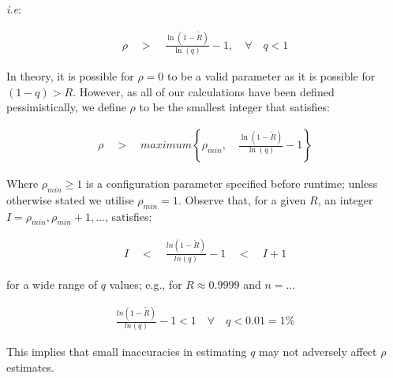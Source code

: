 \begin{description}
        \emph{i.e}:        
        
        \begin{equation} \label{eq:rho_ie}
            \begin{aligned}
                \rho \quad > \quad \frac{\ln\left(1 - \tilde{R}\right)}{\ln(q)} - 1, \quad \forall \quad q < 1
            \end{aligned}
        \end{equation}
               
        In theory, it is possible for $\rho = 0$ to be a valid parameter as it is possible for $(1-q) > R$.  However, as all of our calculations have been defined pessimistically, we define $\rho$ to be the smallest integer that satisfies:
        
        \begin{equation}
            \begin{aligned}
                \rho \quad > \quad maximum \left\{\rho_{min}, \quad \frac{\ln\left(1 - \tilde{R}\right)}{\ln(q)} - 1 \right\}
            \end{aligned}
        \end{equation}
        
        Where $\rho_{min} \geq 1$ is a configuration parameter specified before runtime; unless otherwise stated we utilise $\rho_{min} = 1$.  Observe that, for a given $R$, an integer $I =\rho_{min}, \rho_{min} + 1, \ldots$, satisfies: 

        \begin{equation}
            \begin{aligned}
                I \quad < \quad  \frac{ln \left(1 - \tilde{R}\right)}{ln(q)} - 1 \quad < \quad I + 1
            \end{aligned}
        \end{equation}
        
        for a wide range of $q$ values; e.g., for $R \approx 0.9999$ and $n = \ldots$

        \begin{equation}
            \begin{aligned}
                \frac{ln(1- \tilde{R})}{ln(q)}-1 < 1 \quad \forall \quad q < 0.01 = 1\%
            \end{aligned}
        \end{equation}

        This implies that small inaccuracies in estimating $q$ may not adversely affect $\rho$ estimates.  


\end{description}
